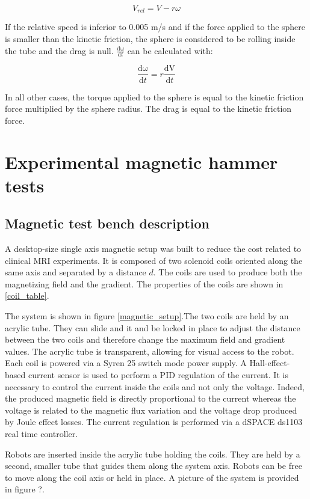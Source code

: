 \documentclass[letterpaper, 10 pt, conference]{ieeeconf}  %
\begin{document}
\begin{equation}
V_{rel}=V-r\omega
\label{relV}
\end{equation}

 
If the relative speed is inferior to 0.005 m/s and if the force applied to the sphere is smaller than the kinetic friction, the sphere is considered to be rolling inside the tube and the drag is null. $\frac{\mathrm{d\omega } }{\mathrm{d} t}$ can be calculated with:

\begin{equation}
\frac{\mathrm{d\omega } }{\mathrm{d} t}=r\frac{\mathrm{dV } }{\mathrm{d} t}
\label{domega}
\end{equation}

In all other cases, the torque applied to the sphere is equal to the kinetic friction force multiplied by the sphere radius. The drag is equal to the kinetic friction force.


\section{Experimental magnetic hammer tests}

\subsection{Magnetic test bench description}

A desktop-size single axis magnetic setup was built to reduce the cost related to clinical MRI experiments. It is composed of two solenoid coils oriented along the same axis and separated by a distance $d$. The coils are used to produce both the magnetizing field and the gradient. The properties of the coils are shown in \cref{coil_table}.\par
The system is shown in figure \cref{magnetic_setup}.The two coils are held by an acrylic tube. They can slide and it and be locked in place to adjust the distance between the two coils and therefore change the maximum field and gradient values. The acrylic tube is transparent, allowing for visual access to the robot.
Each coil is powered via a Syren 25 switch mode power supply. A Hall-effect-based current sensor is used to perform a PID regulation of the current. It is necessary to control the current inside the coils and not only the voltage. Indeed, the produced magnetic field is directly proportional to the current whereas the voltage is related to the magnetic flux variation and the voltage drop produced by Joule effect losses. The current regulation is performed via a dSPACE ds1103 real time controller. \par
Robots are inserted inside the acrylic tube holding the coils. They are held by a second, smaller tube that guides them along the system axis. Robots can be free to move along the coil axis or held in place. A picture of the system is provided in figure ?.
\end{document}

